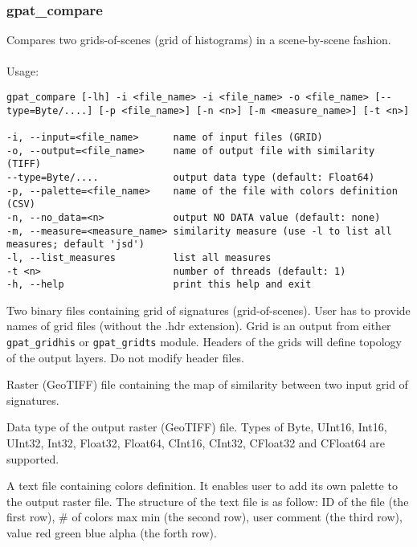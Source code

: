 \subsubsection{gpat\_compare}
Compares two grids-of-scenes (grid of histograms) in a scene-by-scene fashion. 
\\\\
Usage:

\begin{minipage}{\linewidth}
\begin{lstlisting}
gpat_compare [-lh] -i <file_name> -i <file_name> -o <file_name> [--type=Byte/....] [-p <file_name>] [-n <n>] [-m <measure_name>] [-t <n>]

-i, --input=<file_name>      name of input files (GRID)
-o, --output=<file_name>     name of output file with similarity (TIFF)
--type=Byte/....             output data type (default: Float64)
-p, --palette=<file_name>    name of the file with colors definition (CSV)
-n, --no_data=<n>            output NO DATA value (default: none)
-m, --measure=<measure_name> similarity measure (use -l to list all measures; default 'jsd')
-l, --list_measures          list all measures
-t <n>                       number of threads (default: 1)
-h, --help                   print this help and exit
\end{lstlisting}
\end{minipage}


Two binary files containing grid of signatures (grid-of-scenes). 
User has to provide names of grid files (without the .hdr extension). 
Grid is an output from either {\tt gpat\_gridhis} or {\tt gpat\_gridts} module. 
Headers of the grids will define topology of the output layers. 
Do not modify header files.


Raster (GeoTIFF) file containing the map of similarity between two input grid of signatures. 


Data type of the output raster (GeoTIFF) file. Types of Byte, UInt16, Int16, UInt32, Int32, Float32, Float64, CInt16, CInt32, CFloat32 and CFloat64 are supported.


A text file containing colors definition. 
It enables user to add its own palette to the output raster file.
The structure of the text file is as follow:
ID of the file (the first row), \# of colors max min (the second row), user comment (the third row), value red green blue alpha (the forth row). 

